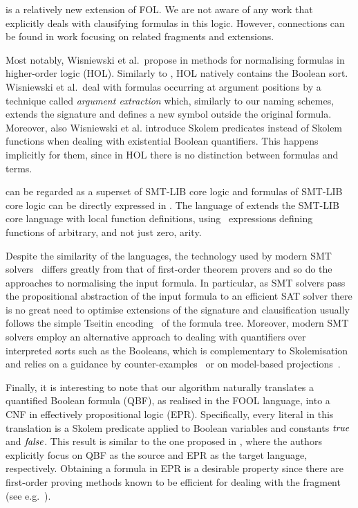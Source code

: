 \folb{} is a relatively new extension of FOL. We are not aware of any work that explicitly deals with clausifying formulas in this logic. However, connections can be found in work focusing on related fragments and extensions.

Most notably, Wisniewski et al.~propose in %
\cite{DBLP:conf/cade/WisniewskiSKB16}
methods for normalising formulas in higher-order logic (HOL). Similarly to \folb{},
HOL natively contains the Boolean sort. Wisniewski et al.~deal with 
formulas occurring at argument positions by a technique called \emph{argument extraction} 
which, similarly to our naming schemes, extends the signature and defines a new symbol
outside the original formula. Moreover, also Wisniewski et al. introduce Skolem predicates 
instead of Skolem functions when dealing with existential Boolean quantifiers. 
This happens implicitly for them, since in HOL there is no distinction between formulas and terms.

\folb{} can be regarded as a superset of SMT-LIB \cite{BarFT-SMTLIB} core logic and formulas of SMT-LIB core logic can be directly expressed in \folb{}. The language of \folb{} extends the SMT-LIB core language with local function definitions, using \LETIN\ expressions defining functions of arbitrary, and not just zero, arity. 

Despite the similarity of the languages, the technology used by modern SMT solvers~\cite{DBLP:journals/jacm/NieuwenhuisOT06}
differs greatly from that of %
first-order theorem provers and so do the approaches to normalising the input formula.
In particular, as SMT solvers pass the propositional abstraction of the input formula to an efficient SAT solver
there is no great need to optimise extensions of the signature 
and clausification usually follows the simple Tseitin encoding~\cite{tseitin_enc} of the formula tree.
%
Moreover, modern SMT solvers employ an alternative approach to dealing with quantifiers over interpreted sorts such as the Booleans, 
which is complementary to Skolemisation
and relies on a guidance by counter-examples~\cite{DBLP:journals/corr/Reynolds0K15} or on model-based projections~\cite{LPAR-20:Playing_with_Quantified_Satisfaction}.

Finally, it is interesting to note that our \nfcnf{} algorithm naturally translates a quantified Boolean formula (QBF),
as realised in the FOOL language, into a CNF in effectively propositional logic (EPR).
Specifically, every literal in this translation is 
a Skolem predicate applied to Boolean variables and constants $\mathit{true}$ and $\mathit{false}$.
This result is similar to the one proposed in \cite{DBLP:conf/cade/SeidlLB12},
where the authors explicitly focus on QBF as the source and EPR as the target language, respectively.
Obtaining a formula in EPR is a desirable property %
since there are first-order proving methods 
known to be efficient for dealing with the fragment (see e.g.~\cite{DBLP:conf/birthday/Korovin13}).